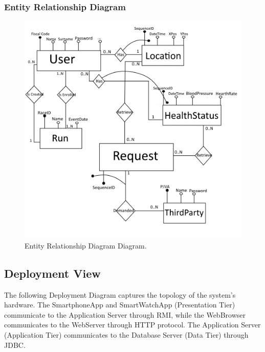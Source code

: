 \clearpage

\subsubsection{Entity Relationship Diagram}
\begin{figure}[H]
\centering
\includegraphics[scale=0.65]{Images/ERDiagram.png}
\caption{Entity Relationship Diagram Diagram.}
\end{figure}

\newpage
\subsection{Deployment View}
The following Deployment Diagram captures the topology of the system's hardware.
The SmartphoneApp and SmartWatchApp (Presentation Tier) communicate to the Application Server through RMI, while the WebBrowser communicates to the WebServer through HTTP protocol. The Application Server (Application Tier) communicates to the Database Server (Data Tier) through JDBC.

